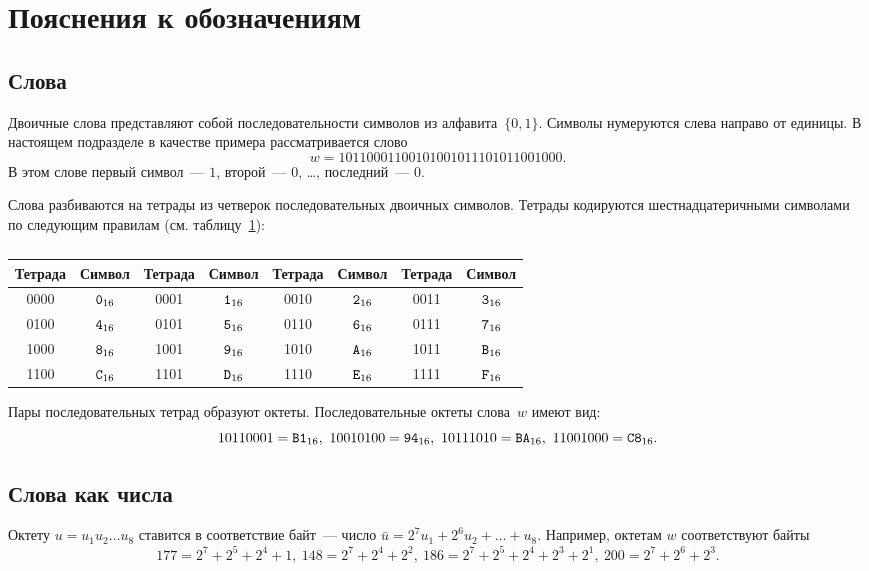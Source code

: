 \section{Пояснения к обозначениям}

\subsection{Слова}

Двоичные слова представляют собой последовательности символов из 
алфавита~$\{0,1\}$. Символы нумеруются слева направо от единицы.
%
В настоящем подразделе в качестве примера рассматривается слово
$$
w=1011 0001 1001 0100 1011 1010 1100 1000.
$$
В этом слове первый символ~--- $1$, 
второй~--- $0$, \ldots, последний~--- $0$.

Слова разбиваются на тетрады из четверок последовательных двоичных символов.
%
Тетрады кодируются шестнадцатеричными символами по следующим правилам
(см. таблицу~\ref{Table.Hex}):

\begin{table}[h]
\caption{}\label{Table.Hex}
\begin{tabular}{|c|c||c|c||c|c||c|c|}
\hline
Тетрада & Символ & Тетрада & Символ & Тетрада & Символ & Тетрада & Символ\\
\hline
\hline
0000 & $\texttt{0}_{16}$ & 0001 & $\texttt{1}_{16}$ & 
0010 & $\texttt{2}_{16}$ & 0011 & $\texttt{3}_{16}$\\
0100 & $\texttt{4}_{16}$ & 0101 & $\texttt{5}_{16}$ & 
0110 & $\texttt{6}_{16}$ & 0111 & $\texttt{7}_{16}$\\ 
1000 & $\texttt{8}_{16}$ & 1001 & $\texttt{9}_{16}$ & 
1010 & $\texttt{A}_{16}$ & 1011 & $\texttt{B}_{16}$\\ 
1100 & $\texttt{C}_{16}$ & 1101 & $\texttt{D}_{16}$ & 
1110 & $\texttt{E}_{16}$ & 1111 & $\texttt{F}_{16}$\\ 
\hline
\end{tabular}
\end{table}

Пары последовательных тетрад образуют октеты.
Последовательные октеты слова~$w$ имеют вид:
$$
1011 0001=\hex{B1},\ 
1001 0100=\hex{94},\ 
1011 1010=\hex{BA},\  
1100 1000=\hex{C8}.
$$

\subsection{Слова как числа}

Октету $u=u_1 u_2\ldots u_8$ ставится в соответствие байт~--- 
число $\bar{u}=2^7u_1+2^6 u_2+\ldots + u_8$. 
Например, октетам $w$ соответствуют байты
$$
177=2^7+2^5+2^4+1,\ 
148=2^7+2^4+2^2,\ 
186=2^7+2^5+2^4+2^3+2^1,\ 
200=2^7+2^6+2^3.
$$

